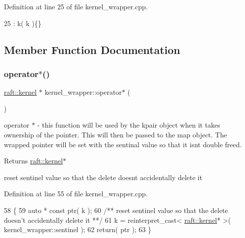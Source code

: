 Definition at line 25 of file kernel\+\_\+wrapper.\+cpp.


\begin{DoxyCode}
25 : k( k )\{\}
\end{DoxyCode}


\subsection{Member Function Documentation}
\hypertarget{classraft_1_1kernel__wrapper_a3275179f2fabef65a683a24eeff2088e}{}\label{classraft_1_1kernel__wrapper_a3275179f2fabef65a683a24eeff2088e} 
\subsubsection{\texorpdfstring{operator$\ast$()}{operator*()}}
{\footnotesize\ttfamily \hyperlink{classraft_1_1kernel}{raft\+::kernel} $\ast$ kernel\+\_\+wrapper\+::operator$\ast$ (\begin{DoxyParamCaption}{ }\end{DoxyParamCaption})\hspace{0.3cm}{\ttfamily [protected]}}

operator $\ast$ -\/ this function will be used by the kpair object when it takes ownership of the pointer. This will then be passed to the map object. The wrapped pointer will be set with the sentinal value so that it isn\textquotesingle{}t double freed. \begin{DoxyReturn}{Returns}
\hyperlink{classraft_1_1kernel}{raft\+::kernel}$\ast$ 
\end{DoxyReturn}
reset sentinel value so that the delete doesn\textquotesingle{}t accidentally delete it 

Definition at line 55 of file kernel\+\_\+wrapper.\+cpp.


\begin{DoxyCode}
58 \{
59     \textcolor{keyword}{auto} * \textcolor{keyword}{const} ptr( k );\textcolor{comment}{}
60 \textcolor{comment}{    /** reset sentinel value so that the delete doesn't accidentally delete it **/}
61     k = \textcolor{keyword}{reinterpret\_cast<} \hyperlink{classraft_1_1kernel}{raft::kernel}* \textcolor{keyword}{>}( kernel\_wrapper::sentinel );
62     \textcolor{keywordflow}{return}( ptr );
63 \}
\end{DoxyCode}


